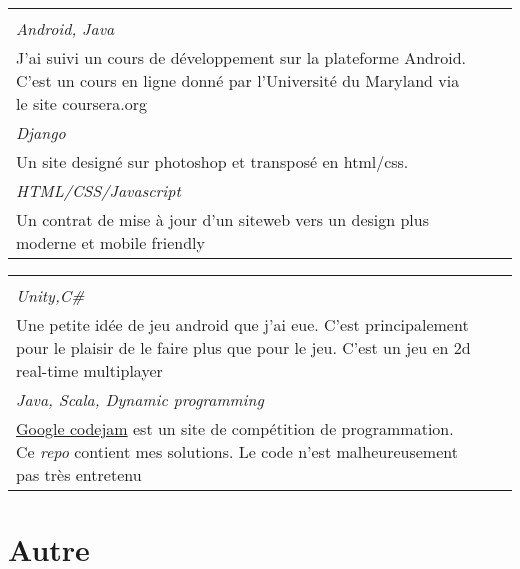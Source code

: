 \documentclass[a4paper,10pt]{extarticle}
\makeatletter
\newlength{\indicewidth}%
\newlength{\separatorcolumnwidth}%
\newlength{\maincolumnwidth}%
\newcommand{\indicestyle}[1]{\slshape\textcolor{color0}{#1}}
\newcommand{\cvboxitem}[5]{}
\renewcommand{\cvboxitem}[5]{%
	\begin{minipage}[t]{\linewidth}
	
	$\bullet$ \textbf{#1}
	\ifthenelse{\equal{#2}{}}{}{, {\slshape #2}}\par%
	\raggedright{\scriptsize\href{#3}{#3}}\\
	{\small\slshape\color{Bittersweet} {#4}}\vspace{0.2em}\\
	{#5}

	\end{minipage}
	
}
\newcommand{\cvtriplebox}[3]{}
\renewcommand{\cvtriplebox}[3]{
\begin{tabular*}{\linewidth}{  
                   p{\dimexpr 0.33\linewidth-1\tabcolsep } 
                   p{\dimexpr 0.33\linewidth-1\tabcolsep }  
                   p{\dimexpr 0.33\linewidth-1\tabcolsep } 
                   } 
{#1}&{#2}&{#3}\tabularnewline
\end{tabular*}
}
\def\middleline{
\raisebox{0.35em}{\line(1,0){50}}
}
\renewcommand{\subsection}[1]{
\par\addvspace{3ex}\hspace{-2em}
\begin{tabular}{@{}p{\indicewidth}@{\hspace{\separatorcolumnwidth}}p{\maincolumnwidth}@{}}%
    \raggedleft\indicestyle{}\middleline & { \strut\bfseries {#1} }%
    \par
\end{tabular}%
\vspace{-0.5em}
}
\makeatother
\begin{document}
\cvtriplebox
{\cvboxitem{Programming Mobile Applications for Android Handheld Systems}{}{https://class.coursera.org/android-001}{Android, Java}
{J'ai suivi un cours de développement sur la plateforme Android. C'est un cours en ligne donné par l'Université du Maryland via le site coursera.org}
}
{\cvboxitem{Site web}{abandonné}{http://coursmusique.codefaction.webfactional.com}{Django}
{Un site designé sur photoshop et transposé en html/css.}}
{
\cvboxitem{Site Web}{contrat}{http://gitmycode.github.io/avocatmontreal/}{ HTML/CSS/Javascript}
{Un contrat de mise à jour d'un siteweb vers un design plus moderne et mobile friendly }
}
\cvtriplebox
{\cvboxitem{Android Game}{en cours}{https://github.com/GitMyCode/laser-game}{Unity,C\#}{Une petite idée de jeu android que j'ai eue. C'est principalement pour le plaisir de le faire plus que pour le jeu. C'est un jeu en 2d real-time multiplayer}}
{\cvboxitem{Google Codejam}{}{https://github.com/GitMyCode/code-jam}{Java, Scala, Dynamic programming}
{\href{https://code.google.com/codejam}{Google codejam} est un site de compétition de programmation. Ce \emph{repo} contient mes solutions. Le code n'est malheureusement pas très entretenu }}

{}



\vspace{-2em}
\section{Autre}\vspace{-2.5em}
\begin{comment}
\begin{tabular*}{\linewidth}{  
                   p{\dimexpr 0.33\linewidth-1\tabcolsep } 
                   p{\dimexpr 0.66\linewidth-1\tabcolsep }  
                   }
\begin{minipage}[t]{\linewidth}                   
\subsection{Langue}
\begin{itemize}
\item[$\bullet$] Français langue maternelle 
\item Anglais fonctionnel
\end{itemize}
\end{minipage}
&
\begin{minipage}[t]{\linewidth}
\subsection{Intérêt}
\begin{itemize}
\item[$\bullet$] Programmation : Toujours à la recherche de projets intéressants !
\item Guitare
\end{itemize}
\end{minipage}
\tabularnewline

\end{tabular*}
\end{comment}
\end{document}
